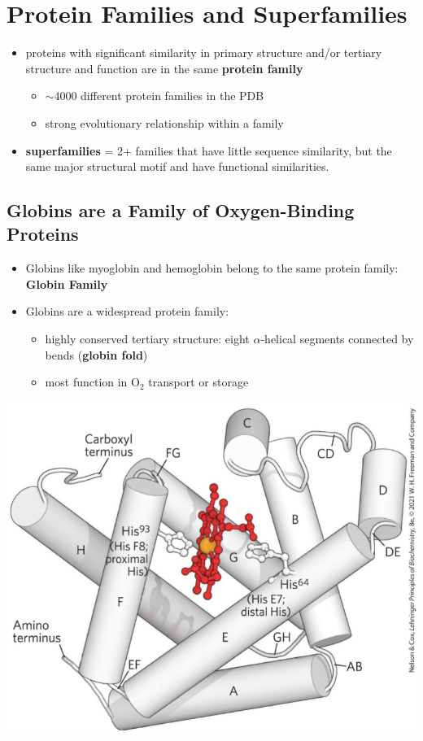 \documentclass[10pt]{article}
\begin{document}
\section*{Protein Families and Superfamilies}
\begin{itemize}
    \item proteins with significant similarity in primary structure and/or tertiary structure and function are in the same \textbf{protein family}
    \begin{itemize}
        \item $\sim$4000 different protein families in the PDB
        \item strong evolutionary relationship within a family
    \end{itemize}
    \item \textbf{superfamilies} = 2+ families that have little sequence similarity, but the same major structural motif and have functional similarities.
\end{itemize}

\subsection*{Globins are a Family of Oxygen-Binding Proteins}
\begin{itemize}
    \item Globins like myoglobin and hemoglobin belong to the same protein family: \textbf{Globin Family}
    \item Globins are a widespread protein family:
    \begin{itemize}
        \item highly conserved tertiary structure: eight $\alpha$-helical segments connected by bends (\textbf{globin fold})
        \item most function in O$_2$ transport or storage
    \end{itemize}
\end{itemize}
\begin{center}
    \includegraphics*[scale=0.5]{L1_17.png}
\end{center}
\end{document}

